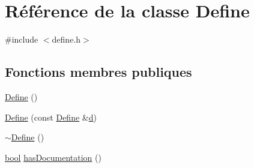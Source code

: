 \hypertarget{class_define}{}\section{Référence de la classe Define}
\label{class_define}


{\ttfamily \#include $<$define.\+h$>$}

\subsection*{Fonctions membres publiques}
\begin{DoxyCompactItemize}
\item 
\hyperlink{class_define_a01b6ebf64a16c1105dca1b76d9a55ebc}{Define} ()
\item 
\hyperlink{class_define_a3bb88bf929e5153195417b3b40070df5}{Define} (const \hyperlink{class_define}{Define} \&\hyperlink{060__command__switch_8tcl_af43f4b1f0064a33b2d662af9f06d3a00}{d})
\item 
\hyperlink{class_define_aa8ab92b3008cb0b8a0b13a13f23f56b7}{$\sim$\+Define} ()
\item 
\hyperlink{qglobal_8h_a1062901a7428fdd9c7f180f5e01ea056}{bool} \hyperlink{class_define_a1d2946362d2573d2f679bf16dea3313e}{has\+Documentation} ()
\end{DoxyCompactItemize}
